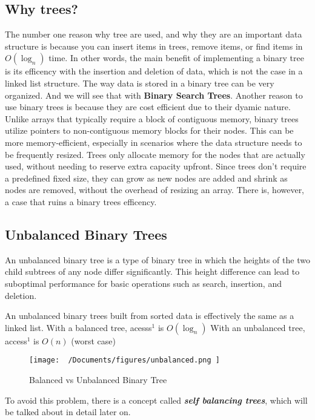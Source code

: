 \documentclass{report}
\begin{document}
\subsection{Why trees?}
The number one reason why tree are used, and why they are an important data structure is because you can insert items in trees, remove items, or find items in $O(\log_n)$ time. In other words, the main benefit of implementing a binary tree is its efficency with the insertion and deletion of data, which is not the case in a linked list structure.
\bigbreak \noindent
The way data is stored in a binary tree can be very organized. And we will see that with \textbf{Binary Search Trees}.
\bigbreak \noindent
Another reason to use binary trees is because they are cost efficient due to their dyamic nature.
\bigbreak \noindent
Unlike arrays that typically require a block of contiguous memory, binary trees utilize pointers to non-contiguous memory blocks for their nodes. This can be more memory-efficient, especially in scenarios where the data structure needs to be frequently resized. Trees only allocate memory for the nodes that are actually used, without needing to reserve extra capacity upfront.
\bigbreak \noindent
Since trees don't require a predefined fixed size, they can grow as new nodes are added and shrink as nodes are removed, without the overhead of resizing an array. There is, however, a case that ruins a binary trees efficency.
\subsection{Unbalanced Binary Trees}
An unbalanced binary tree is a type of binary tree in which the heights of the two child subtrees of any node differ significantly. This height difference can lead to suboptimal performance for basic operations such as search, insertion, and deletion. \vspace{2mm}

\noindent An unbalanced binary trees built from sorted data is effectively the same as a linked list.
\bigbreak \noindent
With a balanced tree, acesss$^1$ is $O(\log_n)$
\bigbreak \noindent
With an unbalanced tree, access$^1$ is $O(n)$ (worst case)
\begin{figure}[ht]
\centering
\texttt{[image:  ~/Documents/figures/unbalanced.png ]}
\caption{Balanced vs Unbalanced Binary Tree}
\end{figure}
\bigbreak \noindent
To avoid this problem, there is a concept called \textit{\textbf{self balancing trees}}, which will be talked about in detail later on.
\end{document}
